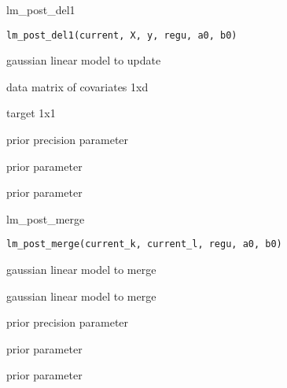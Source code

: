 \documentclass[letterpaper]{book}
\begin{document}
%
\begin{Description}\relax
lm\_post\_del1
\end{Description}
%
\begin{Usage}
\begin{verbatim}
lm_post_del1(current, X, y, regu, a0, b0)
\end{verbatim}
\end{Usage}
%
\begin{Arguments}
\begin{ldescription}
\item[\code{current}] gaussian linear model to update

\item[\code{X}] data matrix of covariates 1xd

\item[\code{y}] target 1x1

\item[\code{regu}] prior precision parameter

\item[\code{a0}] prior parameter

\item[\code{b0}] prior parameter
\end{ldescription}
\end{Arguments}
%
\begin{Description}\relax
lm\_post\_merge
\end{Description}
%
\begin{Usage}
\begin{verbatim}
lm_post_merge(current_k, current_l, regu, a0, b0)
\end{verbatim}
\end{Usage}
%
\begin{Arguments}
\begin{ldescription}
\item[\code{current\_k}] gaussian linear model to merge

\item[\code{current\_l}] gaussian linear model to merge

\item[\code{regu}] prior precision parameter

\item[\code{a0}] prior parameter

\item[\code{b0}] prior parameter
\end{ldescription}
\end{Arguments}
\end{document}
